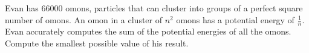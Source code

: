 Evan has $66000$ omons, particles that can cluster into groups of a perfect square number of omons. An omon in a cluster of $n^2$ omons has a potential energy of $\frac1n$. Evan accurately computes the sum of the potential energies of all the omons. Compute the smallest possible value of his result.
